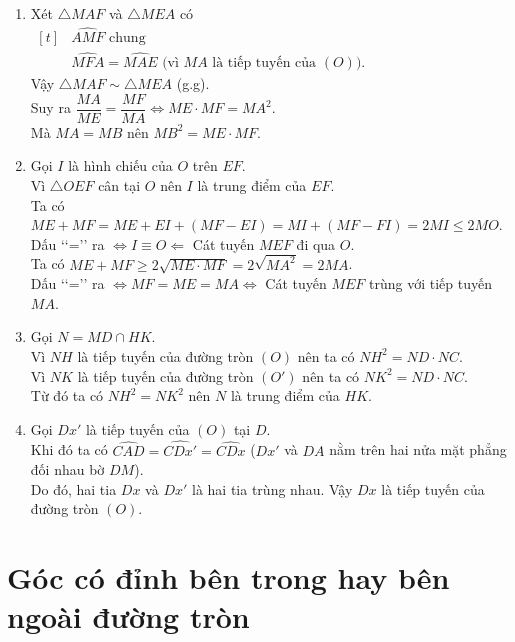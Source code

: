 \begin{bt}
{\begin{enumerate}
			Hay $MA=MB$.
			\item Xét $\triangle MAF$ và $\triangle MEA$ có $\begin{aligned}[t]
			&\widehat{AMF} \text{ chung}\\& \widehat{MFA} = \widehat{MAE} \text{ (vì } MA \text{ là tiếp tuyến của } (O)).
			\end{aligned}$\\
			Vậy $\triangle MAF \sim \triangle MEA$ (g.g).\\
			Suy ra $\dfrac{MA}{ME}=\dfrac{MF}{MA} \Leftrightarrow ME \cdot MF = MA^2$.\\
			Mà $MA=MB$ nên $MB^2=ME \cdot MF$.
			\item Gọi $I$ là hình chiếu của $O$ trên $EF$.\\
			Vì $\triangle OEF$ cân tại $O$ nên $I$ là trung điểm của $EF$.\\
			Ta có $ME+MF = ME+EI + (MF-EI) =MI+(MF-FI)=2MI \le 2MO$.\\
			Dấu \lq\lq =\rq\rq {} ra $\Leftrightarrow I \equiv O \Leftarrow $ Cát tuyến $MEF$ đi qua $O$.\\
			Ta có $ME +MF \ge 2\sqrt{ME \cdot MF} =2\sqrt{MA^2} =2MA$.\\
			Dấu \lq\lq =\rq\rq {} ra $\Leftrightarrow MF=ME=MA \Leftrightarrow$ Cát tuyến $MEF$ trùng với tiếp tuyến $MA$. 
			\item Gọi $N=MD \cap HK$.\\
			Vì $NH$ là tiếp tuyến của đường tròn $(O)$ nên ta có $NH^2=ND \cdot NC$.\\
			Vì $NK$ là tiếp tuyến của đường tròn $(O')$ nên ta có $NK^2=ND \cdot NC$.\\ 
			Từ đó ta có $NH^2=NK^2$ nên $N$ là trung điểm của $HK$.
			\item Gọi $Dx'$ là tiếp tuyến của $(O)$ tại $D$.\\
			Khi đó ta có $\widehat{CAD}=\widehat{CDx'}=\widehat{CDx}$ ($Dx'$ và $DA$ nằm trên hai nửa mặt phẳng đối nhau bờ $DM$).\\
			Do đó, hai tia $Dx$ và $Dx'$ là hai tia trùng nhau. Vậy $Dx$ là tiếp tuyến của đường tròn $(O)$.
		\end{enumerate}
	}
\end{bt} 

\section{Góc có đỉnh bên trong hay bên ngoài đường tròn}

